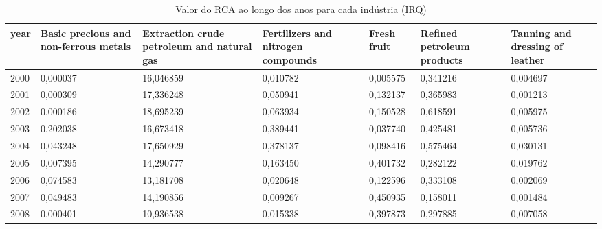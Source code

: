 \begin{table}
\centering
\caption{Valor do RCA ao longo dos anos para cada indústria (IRQ)}
\begin{tabular}{p{1cm}p{2cm}p{2cm}p{2cm}p{2cm}p{2cm}p{2cm}}
\toprule
 year &  Basic precious and non-ferrous metals &  Extraction crude petroleum and natural gas &  Fertilizers and nitrogen compounds &  Fresh fruit &  Refined petroleum products &  Tanning and dressing of leather \\
\midrule
 2000 &                               0,000037 &                                   16,046859 &                            0,010782 &     0,005575 &                    0,341216 &                         0,004697 \\
 2001 &                               0,000309 &                                   17,336248 &                            0,050941 &     0,132137 &                    0,365983 &                         0,001213 \\
 2002 &                               0,000186 &                                   18,695239 &                            0,063934 &     0,150528 &                    0,618591 &                         0,005975 \\
 2003 &                               0,202038 &                                   16,673418 &                            0,389441 &     0,037740 &                    0,425481 &                         0,005736 \\
 2004 &                               0,043248 &                                   17,650929 &                            0,378137 &     0,098416 &                    0,575464 &                         0,030131 \\
 2005 &                               0,007395 &                                   14,290777 &                            0,163450 &     0,401732 &                    0,282122 &                         0,019762 \\
 2006 &                               0,074583 &                                   13,181708 &                            0,020648 &     0,122596 &                    0,333108 &                         0,002069 \\
 2007 &                               0,049483 &                                   14,190856 &                            0,009267 &     0,450935 &                    0,158011 &                         0,001484 \\
 2008 &                               0,000401 &                                   10,936538 &                            0,015338 &     0,397873 &                    0,297885 &                         0,007058 \\

\end{tabular}
\end{table}

